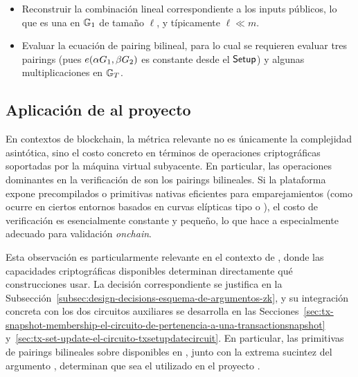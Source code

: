 \begin{itemize}[itemsep=0.1 cm]
	\item Reconstruir la combinación lineal correspondiente a los inputs públicos, lo que es una \MSM en $\mathbb{G}_1$ de tamaño $\ell$, y típicamente $\ell \ll m$.
	\item Evaluar la ecuación de pairing bilineal, para lo cual se requieren evaluar tres pairings (pues $e\!\left(\alpha G_1,\beta G_2\right)$ es constante desde el $\mathsf{Setup}$) y algunas multiplicaciones en $\mathbb{G}_T$.
\end{itemize}

\subsection{Aplicación de \Groth al proyecto}
\label{subsec:apendice-b-groth16-aplicacion-de-groth-al-proyecto}

En contextos de blockchain, la métrica relevante no es únicamente la complejidad asintótica, sino el costo concreto en términos de operaciones criptográficas soportadas por la máquina virtual subyacente. En particular, las operaciones dominantes en la verificación de \Groth son los pairings bilineales. Si la plataforma expone precompilados o primitivas nativas eficientes para emparejamientos (como ocurre en ciertos entornos basados en curvas elípticas tipo \BN o \BLS), el costo de verificación es esencialmente constante y pequeño, lo que hace a \Groth especialmente adecuado para validación \textit{onchain}.

Esta observación es particularmente relevante en el contexto de \Cardano, donde las capacidades criptográficas disponibles \Onchain determinan directamente qué construcciones \zkSNARK usar. La decisión correspondiente se justifica en la Subsección~\ref{subsec:design-decisions-esquema-de-argumentos-zk}, y su integración concreta con los dos circuitos auxiliares se desarrolla en las Secciones~\ref{sec:tx-snapshot-membership-el-circuito-de-pertenencia-a-una-transactionsnapshot} y~\ref{sec:tx-set-update-el-circuito-txsetupdatecircuit}. En particular, las primitivas de pairings bilineales sobre \BLS disponibles en \Plutus, junto con la extrema sucintez del argumento \Groth, determinan que sea el \zkSNARK utilizado en el proyecto \cite{groth_validator_modulop}.
